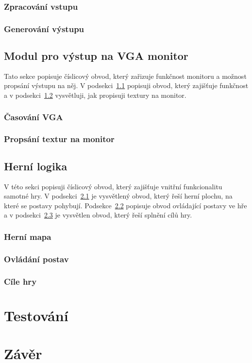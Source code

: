 \documentclass{report}
\begin{document}
\subsection{Zpracování vstupu}\label{sec:zpracovanivstupu}
\subsection{Generování výstupu}\label{sec:generovanivystupu}

\section{Modul pro výstup na VGA monitor}\label{sec:vystupnavga}
Tato sekce popisuje číslicový obvod, který zařizuje funkčnost monitoru a možnost propsání výstupu na něj. V podsekci~\ref{sec:casovanivga} popisuji obvod, který zajišťuje funkčnost a v podsekci~\ref{sec:propsanitextur} vysvětluji, jak propisuji textury na monitor.
\subsection{Časování VGA}\label{sec:casovanivga}
\subsection{Propsání textur na monitor}\label{sec:propsanitextur}

\section{Herní logika}\label{sec:hernilogika}
V této sekci popisuji číslicový obvod, který zajišťuje vnitřní funkcionalitu samotné hry. V podsekci~\ref{sec:hernimapa} je vysvětlený obvod, který řeší herní plochu, na které se postavy pohybují. Podsekce~\ref{sec:ovladanipostav} popisuje obvod ovládající postavy ve hře a v podsekci~\ref{sec:cilehry} je vysvětlen obvod, který řeší splnění cílů hry.
\subsection{Herní mapa}\label{sec:hernimapa}
\subsection{Ovládání postav}\label{sec:ovladanipostav}
\subsection{Cíle hry}\label{sec:cilehry}

\chapter{Testování}

 \chapter*{Závěr}

\begin{thebibliography}{9}
\end{thebibliography}

\end{document}
